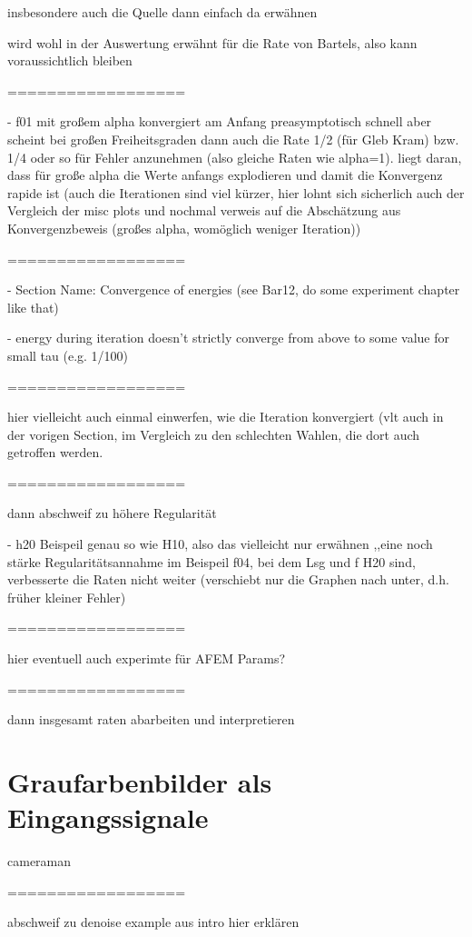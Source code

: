 insbesondere auch die Quelle dann einfach da erwähnen

wird wohl in der Auswertung erwähnt für die Rate von Bartels, also kann 
voraussichtlich bleiben

==================

  - f01 mit großem alpha konvergiert am Anfang preasymptotisch schnell aber
    scheint bei großen Freiheitsgraden dann auch die Rate 1/2 (für Gleb Kram)
    bzw. 1/4 oder so für Fehler anzunehmen (also gleiche Raten wie alpha=1).
    liegt daran, dass für große alpha die Werte anfangs explodieren und damit
    die Konvergenz rapide ist (auch die Iterationen sind viel kürzer, hier
    lohnt sich sicherlich auch der Vergleich der misc plots und nochmal verweis
    auf die Abschätzung aus Konvergenzbeweis (großes alpha, womöglich weniger
    Iteration))

==================

  - Section Name: Convergence of energies (see Bar12, do some experiment
    chapter like that)

  - energy during iteration doesn't strictly converge from above to some value
    for small tau (e.g. 1/100)

==================

hier vielleicht auch einmal einwerfen, wie die Iteration konvergiert
(vlt auch in der vorigen Section, im Vergleich zu den schlechten Wahlen,
die dort auch getroffen werden.

==================

dann abschweif zu höhere Regularität

  - h20 Beispeil genau so wie H10, also das vielleicht nur erwähnen ,,eine 
    noch stärke Regularitätsannahme im Beispeil f04, bei dem Lsg und f H20 sind,
    verbesserte die Raten nicht weiter (verschiebt nur die Graphen nach unter,
    d.h. früher kleiner Fehler)

==================

hier eventuell auch experimte für AFEM Params?

==================

dann insgesamt raten abarbeiten und interpretieren


\section{Graufarbenbilder als Eingangssignale}
cameraman

==================

abschweif zu denoise example aus intro hier erklären

